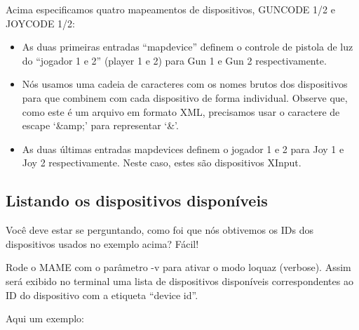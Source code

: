 \documentclass[letterpaper,10pt,brazil]{sphinxmanual}
\begin{document}
Acima especificamos quatro mapeamentos de dispositivos, GUNCODE 1/2 e
JOYCODE 1/2:
\begin{itemize}
\item {} 
As duas primeiras entradas ``mapdevice'' definem o controle de pistola
de luz do ``jogador 1 e 2'' (player 1 e 2) para Gun 1 e Gun 2
respectivamente.

\item {} 
Nós usamos uma cadeia de caracteres com os nomes brutos dos
dispositivos para que combinem com cada dispositivo de forma
individual. Observe que, como este é um arquivo em formato XML,
precisamos usar o caractere de escape `\&amp;' para representar `\&'.

\item {} 
As duas últimas entradas mapdevices definem o jogador 1 e 2 para
Joy 1 e Joy 2 respectivamente. Neste caso, estes são dispositivos
XInput.

\end{itemize}
\clearpage

\subsection{Listando os dispositivos disponíveis}
\label{advanced/devicemap:listando-os-dispositivos-disponiveis}
Você deve estar se perguntando, como foi que nós obtivemos os IDs dos
dispositivos usados no exemplo acima?
Fácil!

Rode o MAME com o parâmetro -v para ativar o modo loquaz (verbose).
Assim será exibido no terminal uma lista de dispositivos disponíveis
correspondentes ao ID do dispositivo com a etiqueta ``device id''.

Aqui um exemplo:
\end{document}
